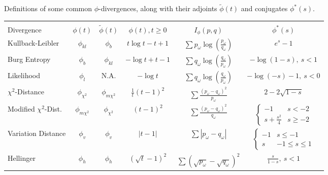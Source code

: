 \documentclass[ijoc,letterpaper]{informs3} %
\begin{document}
\begin{table}
	\TABLE
	{
		Definitions of some common $\phi$-divergences, along with their adjoints $\tilde{\phi}(t)$ and conjugates $\phi^*(s)$.
		\label{tb:phi_definitions}
	}
	{\begin{tabular}{lccccc}
		\hline \\
		Divergence                        & $\phi(t)$          & $\tilde{\phi}(t)$               & $\phi(t), t \geq 0$   & $I_\phi(p,q)$     & $\phi^*(s)$ \\
		\hline
		Kullback-Leibler                  & $\phi_{kl}$        & $\phi_b$                        & $t\log t - t + 1$     & $\sum p_\omega \log\left(\frac{p_\omega}{q_\omega}\right)$ & $e^s - 1$ \\
		Burg Entropy                      & $\phi_b$           & $\phi_{kl}$                     & $-\log t + t - 1$     & $\sum q_\omega \log\left(\frac{q_\omega}{p_\omega}\right)$ & $-\log(1-s),\ s < 1$  \\
		Likelihood                        & $\phi_l$           & N.A.                      & $-\log t$             & $\sum q_\omega \log\left(\frac{q_\omega}{p_\omega}\right)$ & $-\log(-s) - 1,\ s < 0$ \\
		$\chi^2$-Distance                 & $\phi_{\chi^2}$    & $\phi_{m\chi^2}$                & $\frac{1}{t} (t-1)^2$ & $\sum \frac{(p_\omega-q_\omega)^2}{p_\omega}$              & $2 - 2\sqrt{1-s}$  \\
		Modified $\chi^2$-Dist.           & $\phi_{m\chi^2}$   & $\phi_{\chi^2}$                 & $(t-1)^2$             & $\sum \frac{(p_\omega - q_\omega)^2}{q_\omega}$            & $\begin{cases} -1 & s < -2 \\ s + \frac{s^2}{4} & s \geq -2 \end{cases}$ \\
		Variation Distance                & $\phi_v$           & $\phi_v$                        & $|t-1|$               & $\sum |p_\omega - q_\omega|$                               & $\begin{cases} -1 & s \leq -1 \\ s & -1 \leq s \leq 1 \end{cases}$ \\
		Hellinger                         & $\phi_h$           & $\phi_h$                        & $(\sqrt{t} - 1)^2$    & $\sum (\sqrt{p_\omega} - \sqrt{q_\omega})^2$               & $\frac{s}{1-s},\ s < 1$ \\
	\hline
	\end{tabular}}
	{}
\end{table}
\end{document}
